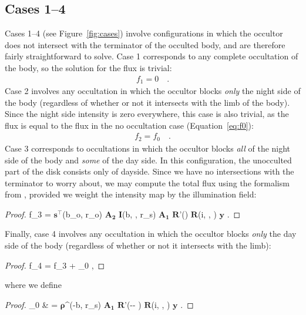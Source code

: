 \documentclass[modern]{aastex62}
\newcommand{\BF}[1]{\ensuremath{\mathbf{#1}}}
\newcommand{\BS}[1]{\ensuremath{\boldsymbol{#1}}}
\newcommand{\sTe}{\ensuremath{\BF{s}^\top}}
\begin{document}
\subsection{Cases 1--4}
\label{sec:cases-1-4}
%
Cases 1--4 (see Figure~\ref{fig:cases}) involve configurations in which the
occultor does not intersect with
the terminator of the occulted body, and are therefore fairly
straightforward to solve.
%
Case 1 corresponds to any complete occultation of the body, so the
solution for the flux is trivial:
%
\begin{align}
    \label{eq:sT1}
    f_1 = 0
    \quad.
\end{align}
%
Case 2 involves any occultation in which the occultor blocks \emph{only} the
night side of the body (regardless of whether or not it intersects with the
limb of the body). Since the night side intensity is zero everywhere, this case
is also trivial, as the flux is equal to the flux in the no occultation case
(Equation~\ref{eq:f0}):
%
\begin{align}
    \label{eq:sT2}
    f_2 = f_0
    \quad.
\end{align}
%
Case 3 corresponds to occultations in which the occultor blocks \emph{all} of
the night side of the body and \emph{some} of the day side. In this
configuration, the unocculted part of the disk consists only of dayside.
Since we have no intersections with the terminator to worry about,
we may compute the total flux using the \starry formalism from
\citet{Luger2019}, provided we weight the intensity map by the illumination
field:
%
\begin{proof}{}
    \label{eq:f3}
    f_3 = \sTe(b_o, r_o)
    \BF{A_2}
    \BF{I}(b, \theta, r_s)
    \BF{A_1}
    \BF{R}'(\omega)
    \BF{R}(i, \lambda, \vartheta)
    \BF{y}
    \quad.
\end{proof}
%
Finally, case 4 involves any occultation in which the occultor blocks
\emph{only} the day side of the body (regardless of whether or not it
intersects with the limb):
%
\begin{proof}{}
    \label{eq:sT4}
    f_4 = f_3 + _0
    \quad,
\end{proof}
%
where we define
%
\begin{proof}{}
    \label{eq:f0hat}
    _0 & =
    \BS{\rho}^\top(-b, r_s)
    \BF{A_1}
    \BF{R}'(-\theta - \pi)
    \BF{R}(i, \lambda, \vartheta)
    \BF{y}
    \quad.
\end{proof}

%
\end{document}
